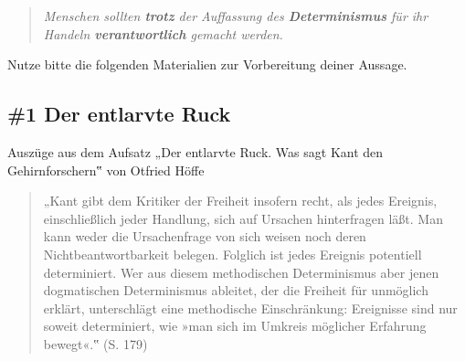 \documentclass[
  a4paper,
]{report}
\begin{document}
\begin{quote}
\emph{Menschen sollten \textbf{trotz} der Auffassung des \textbf{Determinismus} für ihr Handeln \textbf{verantwortlich} gemacht werden.}
\end{quote}

Nutze bitte die folgenden Materialien zur Vorbereitung deiner Aussage.

\hypertarget{pr-expert-ev1}{%
\subsection{\#1 Der entlarvte Ruck}\label{pr-expert-ev1}}

Auszüge aus dem Aufsatz „Der entlarvte Ruck. Was sagt Kant den Gehirnforschern‟ von Otfried Höffe \citeyearpar{Höffe2004}

\begin{quote}
„Kant gibt dem Kritiker der Freiheit insofern recht, als jedes Ereignis, einschließlich jeder Handlung, sich auf Ursachen hinterfragen läßt. Man kann weder die Ursachenfrage von sich weisen noch deren Nichtbeantwortbarkeit belegen. Folglich ist jedes Ereignis potentiell determiniert. Wer aus diesem methodischen Determinismus aber jenen dogmatischen Determinismus ableitet, der die Freiheit für unmöglich erklärt, unterschlägt eine methodische Einschränkung: Ereignisse sind nur soweit determiniert, wie »man sich im Umkreis möglicher Erfahrung bewegt«.‟ (S. 179)
\end{quote}
\end{document}
